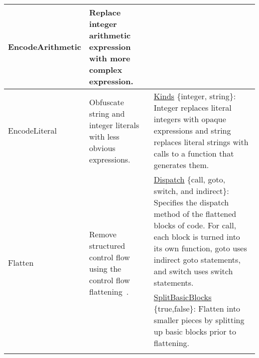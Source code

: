 \begin{table*}[!hp]
\begin{tabular}{|p{2.25cm}|p{4cm}|p{11cm}|}
EncodeArithmetic                     & Replace integer arithmetic expression with more complex expression.                                                                                                                                                                                                                  &                                                                                                                                                                                                                                                                                            \\ \hline
EncodeLiteral                        & Obfuscate string and integer literals with less obvious expressions.                                                                                                                                                                                                                    & \underline{Kinds} \{integer, string\}: Integer replaces literal integers with opaque expressions and string replaces literal strings with calls to a function that generates them.                                                                                                                                                                                                                                                                                            \\ \hline
\multirow{6}{*}{Flatten}             & \multirow{6}{4cm}{Remove structured control flow using the control flow flattening~\cite{wang00security}.}                                                                                                                                                                                         & \underline{Dispatch} \{call, goto, switch, and indirect\}: Specifies the dispatch method of the flattened blocks of code. For call, each block is turned into its own function, goto uses indirect goto statements, and switch uses switch statements.                                                                                                       \\ \cline{3-3} 
                                     &                                                                                                                                                                                                                                                                                                         & \underline{SplitBasicBlocks} \{true,false\}: Flatten into smaller pieces by splitting up basic blocks prior to flattening.                                                                                                                                                              \\ \cline{3-3} 

\end{tabular}
\end{table*}
